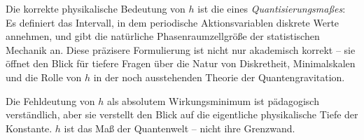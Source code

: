 ﻿\documentclass[12pt,a4paper]{article}
\theoremstyle{plain}
\theoremstyle{definition}
\theoremstyle{remark}
\begin{document}
Die korrekte physikalische Bedeutung von $h$ ist die eines \emph{Quantisierungsmaßes}:
Es definiert das Intervall, in dem periodische Aktionsvariablen diskrete Werte annehmen,
und gibt die natürliche Phasenraumzellgröße der statistischen Mechanik an. Diese
präzisere Formulierung ist nicht nur akademisch korrekt -- sie öffnet den Blick für
tiefere Fragen über die Natur von Diskretheit, Minimalskalen und die Rolle von $h$ in
der noch ausstehenden Theorie der Quantengravitation.

Die Fehldeutung von $h$ als absolutem Wirkungsminimum ist pädagogisch verständlich,
aber sie verstellt den Blick auf die eigentliche physikalische Tiefe der Konstante.
$h$ ist das Maß der Quantenwelt -- nicht ihre Grenzwand.


\end{document}
